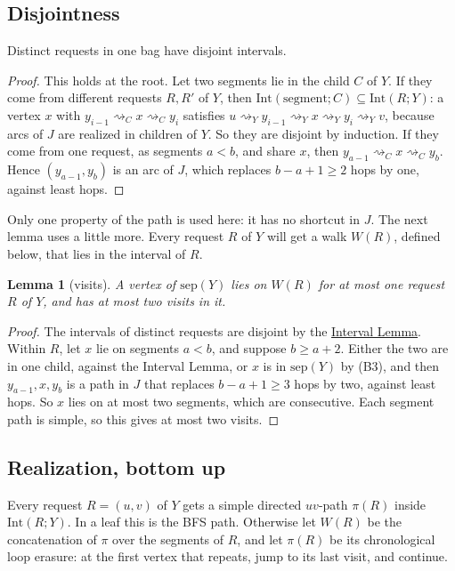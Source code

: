 \documentclass[11pt]{article}
\newtheorem{lemma}[theorem]{Lemma}
\theoremstyle{definition}
\theoremstyle{remark}
\theoremstyle{plain}
\newenvironment{named}[1]{\def\namedtext{#1}\phantomsection\namedinner}{\endnamedinner}
\newcommand{\sep}{\mathrm{sep}}
\newcommand{\Int}{\mathrm{Int}}
\newcommand{\reach}{\rightsquigarrow}
\begin{document}
\subsection{Disjointness}

\begin{named}{Interval Lemma}\label{lem:A}
Distinct requests in one bag have disjoint intervals.
\end{named}
\begin{proof}
This holds at the root. Let two segments lie in the child $C$ of $Y$. If they come from different requests $R,R'$
of $Y$, then $\Int(\text{segment};C)\subseteq\Int(R;Y)$: a vertex $x$ with $y_{i-1}\reach_C x\reach_C y_i$ satisfies
$u\reach_Y y_{i-1}\reach_Y x\reach_Y y_i\reach_Y v$, because arcs of $J$ are realized in children of $Y$. So they
are disjoint by induction. If they come from one request, as segments $a<b$, and share $x$, then
$y_{a-1}\reach_C x\reach_C y_b$. Hence $(y_{a-1},y_b)$ is an arc of $J$, which replaces $b-a+1\ge2$ hops by one,
against least hops.
\end{proof}

Only one property of the path is used here: it has no shortcut in $J$. The next lemma uses a little more.
Every request $R$ of $Y$ will get a walk $W(R)$, defined below, that lies in the interval of $R$.

\begin{lemma}[visits]\label{lem:B}
A vertex of $\sep(Y)$ lies on $W(R)$ for at most one request $R$ of $Y$, and has at most two visits in it.
\end{lemma}
\begin{proof}
The intervals of distinct requests are disjoint by the \hyperref[lem:A]{Interval Lemma}. Within $R$, let $x$ lie on segments
$a<b$, and suppose $b\ge a+2$. Either the two are in one child, against the Interval Lemma, or $x$ is in $\sep(Y)$
by (B3), and then $y_{a-1},x,y_b$ is a path in $J$ that replaces $b-a+1\ge3$ hops by two, against least hops. So
$x$ lies on at most two segments, which are consecutive. Each segment path is simple, so this gives at most two
visits.
\end{proof}

\subsection{Realization, bottom up}

Every request $R=(u,v)$ of $Y$ gets a simple directed $uv$-path $\pi(R)$ inside $\Int(R;Y)$. In a leaf this is the
BFS path. Otherwise let $W(R)$ be the concatenation of $\pi$ over the segments of $R$, and let $\pi(R)$ be its
chronological loop erasure: at the first vertex that repeats, jump to its last visit, and continue.
\end{document}

